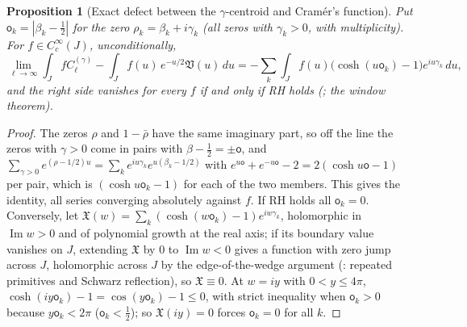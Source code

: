 \documentclass[11pt,a4paper]{article}
\numberwithin{equation}{section}
\newtheorem{proposition}[theorem]{Proposition}
\theoremstyle{definition}
\theoremstyle{remark}
\begin{document}
\begin{proposition}[Exact defect between the $\gamma$-centroid and Cram\'er's function]\label{prop:v13-def}
Put $\mathsf o_k=|\beta_k-\frac12|$ for the zero $\rho_k=\beta_k+i\gamma_k$ (all zeros with $\gamma_k>0$, with multiplicity). For $f\in C_c^\infty(J)$, unconditionally,
\begin{equation}
\lim_{\ell\to\infty}\int_JfC_\ell^{(\gamma)}-\int_Jf(u)\,e^{-u/2}\mathfrak V(u)\,du=-\sum_k\int_Jf(u)\bigl(\cosh(u\mathsf o_k)-1\bigr)e^{iu\gamma_k}\,du ,
\end{equation}
and the right side vanishes for every $f$ if and only if RH holds (\cite[Thm.~5.5]{CasanaV26}; the window theorem).
\end{proposition}
\begin{proof}
The zeros $\rho$ and $1-\bar\rho$ have the same imaginary part, so off the line the zeros with $\gamma>0$ come in pairs with $\beta-\frac12=\pm\mathsf o$, and $\sum_{\gamma>0}e^{(\rho-1/2)u}=\sum_ke^{iu\gamma_k}e^{u(\beta_k-1/2)}$ with $e^{u\mathsf o}+e^{-u\mathsf o}-2=2(\cosh u\mathsf o-1)$ per pair, which is $(\cosh u\mathsf o_k-1)$ for each of the two members. This gives the identity, all series converging absolutely against $f$. If RH holds all $\mathsf o_k=0$. Conversely, let $\mathfrak X(w)=\sum_k(\cosh(w\mathsf o_k)-1)e^{iw\gamma_k}$, holomorphic in $\operatorname{Im}w>0$ and of polynomial growth at the real axis; if its boundary value vanishes on $J$, extending $\mathfrak X$ by $0$ to $\operatorname{Im}w<0$ gives a function with zero jump across $J$, holomorphic across $J$ by the edge-of-the-wedge argument (\cite[Lemma~5.4]{CasanaV26}: repeated primitives and Schwarz reflection), so $\mathfrak X\equiv0$. At $w=iy$ with $0<y\le4\pi$, $\cosh(iy\mathsf o_k)-1=\cos(y\mathsf o_k)-1\le0$, with strict inequality when $\mathsf o_k>0$ because $y\mathsf o_k<2\pi$ ($\mathsf o_k<\frac12$); so $\mathfrak X(iy)=0$ forces $\mathsf o_k=0$ for all $k$.
\end{proof}
\end{document}

